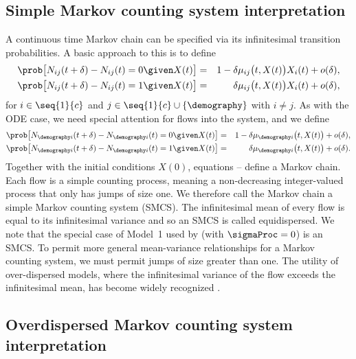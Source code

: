 \subsection{Simple Markov counting system interpretation}
\label{subsec:smcs}
A continuous time Markov chain can be specified via its infinitesimal transition probabilities.
A basic approach to this is to define
\begin{eqnarray}
\label{eq:smcs1}
\prob\big[ N_{ij}(t+\delta)-N_{ij}(t)=0 \given X(t)\big]
 &=& 1-\delta \mu_{ij}\big(t,X(t)\big)X_i(t) + o(\delta),
\\
\label{eq:smcs2}
\prob\big[ N_{ij}(t+\delta)-N_{ij}(t)=1 \given X(t)\big]
 &=& \delta \mu_{ij}\big(t,X(t)\big)X_i(t) + o(\delta),
\end{eqnarray}
for $i\in \seq{1}{c}$ and $j\in\seq{1}{c}\cup\{\demography\}$ with $i\neq j$.
As with the ODE case, we need special attention for flows into the system, and we define
\begin{eqnarray}
\label{eq:smcs3}
\prob\big[ N_{\demography i}(t+\delta)-N_{\demography i}(t)=0 \given X(t)\big]
 &=& 1-\delta \mu_{\demography i}\big(t,X(t)\big) + o(\delta),
\\
\label{eq:smcs4}
\prob\big[ N_{\demography i}(t+\delta)-N_{\demography i}(t)=1 \given X(t)\big]
 &=& \delta \mu_{\demography i}\big(t,X(t)\big) + o(\delta).
\end{eqnarray}
Together with the initial conditions $X(0)$, equations -- define a Markov chain.
Each flow is a simple counting process, meaning a non-decreasing integer-valued process that only has jumps of size one.
We therefore call the Markov chain a simple Markov counting system (SMCS).
The infinitesimal mean of every flow is equal to its infinitesimal variance \cite{breto11} and so an SMCS is called equidispersed.
We note that the special case of Model~1 used by \cite{lee20} (with $\sigmaProc = 0$) is an SMCS.
To permit more general mean-variance relationships for a Markov counting system, we must permit jumps of size greater than one.
The utility of over-dispersed models, where the infinitesimal variance of the flow exceeds the infinitesimal mean, has become widely recognized \cite{stocks20,he10}.

\subsection{Overdispersed Markov counting system interpretation}
\label{subsec:odmcs}

